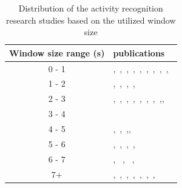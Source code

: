 \begin{table}[htp]
    \centering
\begin{tabular}{|c|>{\centering}m{10cm}|}
\hline 
Window size range (s) & publications\tabularnewline
\hline 
\hline 
0 - 1 & \citep{pirttikangas2006feature},~\citep{stikic2008adl},~\citep{marx2012ad},~\citep{huynh2005analyzing},~\citep{kern2003multi},~\citep{maurer2006activity},~\citep{suutala2007discriminative},~\citep{amft2008recognition},~\citep{han2010implementation},~\citep{wang2012real}\tabularnewline
\hline 
1 - 2 & \citep{pirttikangas2006feature},~\citep{stikic2008adl},~\citep{huynh2005analyzing},~\citep{sun2010activity},~\citep{gjoreski2011accelerometer}\tabularnewline
\hline 
2 - 3 & \citep{mannini2013activity},~\citep{stikic2008adl},~\citep{preece2008comparison},~\citep{mantyjarvi2001recognizing},~\citep{huynh2005analyzing},~\citep{wang2007accelerometry},~\citep{khan2010human},~\citep{sun2010activity},\citep{nam2013physical},\citep{nam2013child} \tabularnewline
\hline 
3 - 4 & \citep{sun2010activity}\tabularnewline
\hline 
4 - 5 & \citep{mannini2013activity},~\citep{stikic2008adl},~\citep{huynh2005analyzing},\citep{parkka2006activity},~\citep{sun2010activity}\tabularnewline
\hline 
5 - 6 & \citep{ravi2005activity},~\citep{altun2010human},~\citep{sun2010activity},~\citep{atallah2011sensor},~\citep{lee2011activity} \tabularnewline
\hline 
6 - 7 & \citep{bao2004activity},
~\citep{Huynh2007ScalableRO},
~\citep{sun2010activity},
~\citep{jiang2011method} \tabularnewline
\hline 
7+ & \citep{mannini2013activity},~\citep{stikic2008adl},~\citep{krause2003unsupervised},~\citep{parkka2006activity},~\citep{kwapisz2011activity},~\citep{siirtola2012user},~\citep{hemalatha2013frequent},~\citep{zheng2013physical} \tabularnewline
\hline 
\end{tabular}
    \caption{Distribution of the activity recognition research studies based on the utilized window size}
    \label{tab:win_size_distribution}
\end{table}


